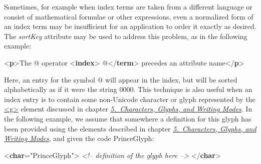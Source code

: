 Sometimes, for example when index terms are taken from a different language or consist of mathematical formulae or other expressions, even a normalized form of an index term may be insufficient for an application to order it exactly as desired. The {\itshape sortKey} attribute may be used to address this problem, as in the following example: \par\bgroup{}\exampleFont \begin{shaded}\noindent\mbox{}{<\textbf{p}>}The @ operator\mbox{}\newline 
{<\textbf{index}>}\mbox{}\newline 
\hspace*{1em}@{</\textbf{term}>}\mbox{}\newline 
{} precedes an\mbox{}\newline 
 attribute name{</\textbf{p}>}\end{shaded}\egroup\par \noindent  Here, an entry for the symbol @ will appear in the index, but will be sorted alphabetically as if it were the string 0000. This technique is also useful when an index entry is to contain some non-Unicode character or glyph represented by the \hyperref[TEI.g]{<g>} element discussed in chapter \textit{\hyperref[WD]{5.\ Characters, Glyphs, and Writing Modes}}. In the following example, we assume that somewhere a definition for this glyph has been provided using the elements described in chapter \textit{\hyperref[WD]{5.\ Characters, Glyphs, and Writing Modes}}, and given the code PrinceGlyph: \par\bgroup{}\exampleFont \begin{shaded}\noindent\mbox{}{<\textbf{char}\hspace*{1em}{xml:id}="{PrinceGlyph}">}\mbox{}\newline 
\textit{<!-- definition of the glyph here -->}\mbox{}\newline 
{</\textbf{char}>}\mbox{}\newline 

\end{shaded}
